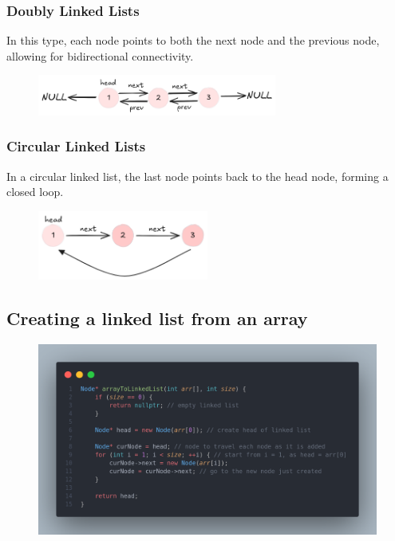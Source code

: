 \documentclass[a4paper, 12pt]{book}
\begin{document}
	\subsubsection{Doubly Linked Lists}
	In this type, each node points to both the next node and the previous node, allowing for bidirectional connectivity.
	\begin{figure}[h]
		\vspace{-2mm}
		\centering
		\includegraphics[width=0.7\textwidth]{1to3dll.png}
		\label{fig:1to3dll}
	\end{figure}
	
	\subsubsection{Circular Linked Lists}
	In a circular linked list, the last node points back to the head node, forming a closed loop.
	\begin{figure}[h]
		\vspace{-2mm}
		\centering
		\includegraphics[width=0.5\textwidth]{1to3cll.png}
		\label{fig:1to3cll}
	\end{figure}
	
	\subsection{Creating a linked list from an array}
		\begin{figure}[h]
		\vspace{-2mm}
		\centering
		\includegraphics[width=\textwidth]{ArrToLL.png}
		\label{fig:ArrtoLL}
	\end{figure}
	
\end{document}

